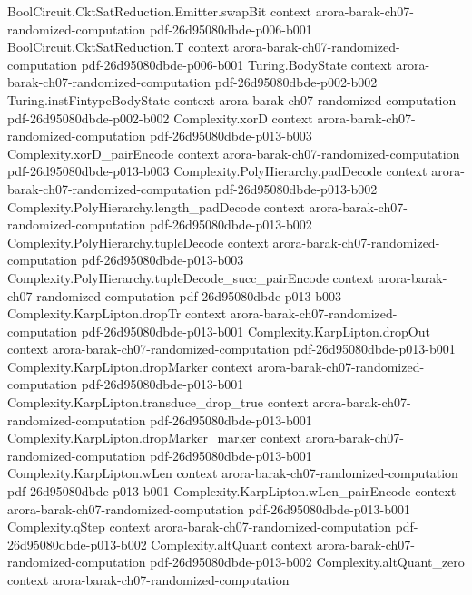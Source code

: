 \begin{theorem}
\proofstep
  {BoolCircuit.CktSatReduction.Emitter.swapBit}
  {context}
  {arora-barak-ch07-randomized-computation}
  {pdf-26d95080dbde-p006-b001}
\proofstep
  {BoolCircuit.CktSatReduction.T}
  {context}
  {arora-barak-ch07-randomized-computation}
  {pdf-26d95080dbde-p006-b001}
\proofstep
  {Turing.BodyState}
  {context}
  {arora-barak-ch07-randomized-computation}
  {pdf-26d95080dbde-p002-b002}
\proofstep
  {Turing.instFintypeBodyState}
  {context}
  {arora-barak-ch07-randomized-computation}
  {pdf-26d95080dbde-p002-b002}
\proofstep
  {Complexity.xorD}
  {context}
  {arora-barak-ch07-randomized-computation}
  {pdf-26d95080dbde-p013-b003}
\proofstep
  {Complexity.xorD_pairEncode}
  {context}
  {arora-barak-ch07-randomized-computation}
  {pdf-26d95080dbde-p013-b003}
\proofstep
  {Complexity.PolyHierarchy.padDecode}
  {context}
  {arora-barak-ch07-randomized-computation}
  {pdf-26d95080dbde-p013-b002}
\proofstep
  {Complexity.PolyHierarchy.length_padDecode}
  {context}
  {arora-barak-ch07-randomized-computation}
  {pdf-26d95080dbde-p013-b002}
\proofstep
  {Complexity.PolyHierarchy.tupleDecode}
  {context}
  {arora-barak-ch07-randomized-computation}
  {pdf-26d95080dbde-p013-b003}
\proofstep
  {Complexity.PolyHierarchy.tupleDecode_succ_pairEncode}
  {context}
  {arora-barak-ch07-randomized-computation}
  {pdf-26d95080dbde-p013-b003}
\proofstep
  {Complexity.KarpLipton.dropTr}
  {context}
  {arora-barak-ch07-randomized-computation}
  {pdf-26d95080dbde-p013-b001}
\proofstep
  {Complexity.KarpLipton.dropOut}
  {context}
  {arora-barak-ch07-randomized-computation}
  {pdf-26d95080dbde-p013-b001}
\proofstep
  {Complexity.KarpLipton.dropMarker}
  {context}
  {arora-barak-ch07-randomized-computation}
  {pdf-26d95080dbde-p013-b001}
\proofstep
  {Complexity.KarpLipton.transduce_drop_true}
  {context}
  {arora-barak-ch07-randomized-computation}
  {pdf-26d95080dbde-p013-b001}
\proofstep
  {Complexity.KarpLipton.dropMarker_marker}
  {context}
  {arora-barak-ch07-randomized-computation}
  {pdf-26d95080dbde-p013-b001}
\proofstep
  {Complexity.KarpLipton.wLen}
  {context}
  {arora-barak-ch07-randomized-computation}
  {pdf-26d95080dbde-p013-b001}
\proofstep
  {Complexity.KarpLipton.wLen_pairEncode}
  {context}
  {arora-barak-ch07-randomized-computation}
  {pdf-26d95080dbde-p013-b001}
\proofstep
  {Complexity.qStep}
  {context}
  {arora-barak-ch07-randomized-computation}
  {pdf-26d95080dbde-p013-b002}
\proofstep
  {Complexity.altQuant}
  {context}
  {arora-barak-ch07-randomized-computation}
  {pdf-26d95080dbde-p013-b002}
\proofstep
  {Complexity.altQuant_zero}
  {context}
  {arora-barak-ch07-randomized-computation}

\end{theorem}
